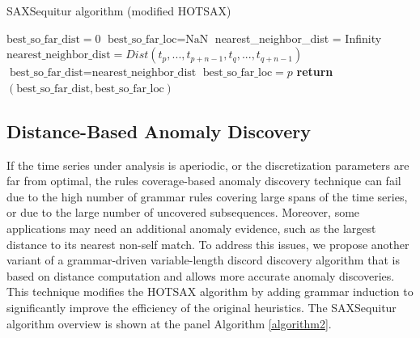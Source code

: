 \documentclass{llncs}
\begin{document}
\begin{algorithm}[!htp]
\caption{SAXSequitur algorithm (modified HOTSAX)}\label{algorithm2}
\begin{algorithmic}[1]
 \State $\text{best\_so\_far\_dist} = 0 $
 \State $\text{best\_so\_far\_loc} = \text{NaN} $
 \Statex{}
    \State nearest\_neighbor\_dist = Infinity
    \Statex{}
           \EndIf 
               \State $\text{nearest\_neighbor\_dist} = Dist (t_{p},...,t_{p+n-1}, t_{q},...,t_{q+n-1})$
           \EndIf 
       \EndIf 
    \EndFor
   \State $\text{best\_so\_far\_dist} = \text{nearest\_neighbor\_dist}$ 
   \State $\text{best\_so\_far\_loc} = p$
 \EndIf   
 \EndFor
 \State \textbf{return} $(\text{best\_so\_far\_dist}, \text{best\_so\_far\_loc})$
\EndProcedure
\end{algorithmic}
\end{algorithm}

\subsection{Distance-Based Anomaly Discovery}
If the time series under analysis is aperiodic, or the discretization parameters are far from optimal, the rules coverage-based anomaly discovery technique can fail due to the high number of grammar rules covering large spans of the time series, or due to the large number of uncovered subsequences. Moreover, some applications may need an additional anomaly evidence, such as the largest distance to its nearest non-self match. To address this issues, we propose another variant of a grammar-driven variable-length discord discovery algorithm that is based on distance computation and allows more accurate anomaly discoveries. This technique modifies the HOTSAX \cite{hot_sax} algorithm by adding grammar induction to significantly improve the efficiency of the original heuristics. The SAXSequitur algorithm overview is shown at the panel Algorithm \ref{algorithm2}.
\end{document}
